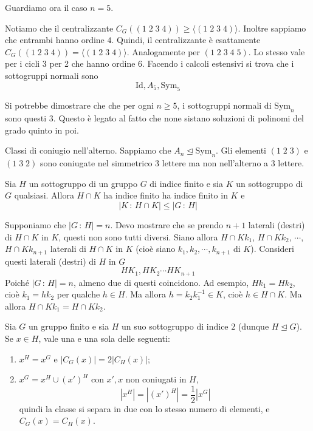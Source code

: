\documentclass[a4paper]{article}
\begin{document}
Guardiamo ora il caso \(n=5\).

Notiamo che il centralizzante \(C_G((1\;2\;3\;4)) \geq \langle(1\;2\;3\;4)\rangle\).
Inoltre sappiamo che entrambi hanno ordine \(4\). Quindi, il centralizzante
è esattamente \(C_G((1\;2\;3\;4)) = \langle(1\;2\;3\;4)\rangle\).
Analogamente per \((1\;2\;3\;4\;5)\). Lo stesso vale per i cicli 3 per 2 che hanno ordine 6.
Facendo i calcoli estensivi si trova che i sottogruppi normali sono
\[
    \text{Id}, A_5, \text{Sym}_5
\]

Si potrebbe dimostrare che che per ogni \(n \geq 5\), i sottogruppi normali di \(\text{Sym}_n\)
sono questi 3. Questo è legato al fatto che none sistano soluzioni di polinomi
del grado quinto in poi.

Classi di coniugio nell'alterno.
Sappiamo che \(A_n \unlhd \text{Sym}_n\).
Gli elementi \((1\;2\;3)\) e \((1\;3\;2)\) sono coniugate nel simmetrico
3 lettere ma non nell'alterno a 3 lettere.

\begin{snippetlemma}{}
    Sia \(H\) un sottogruppo di un gruppo \(G\)
    di indice finito e sia \(K\) un sottogruppo di
    \(G\) qualsiasi. Allora \(H \cap K\) ha indice finito
    ha indice finito in \(K\)
    e
    \[
        |K\,:\, H \cap K| \leq |G\,:\,H|
    \]
\end{snippetlemma}

\begin{snippetproof}{}
    Supponiamo che \(|G\,:\,H| = n\).
    Devo mostrare che se prendo \(n+1\) laterali (destri) di \(H \cap K\)
    in \(K\), questi non sono tutti diversi.
    Siano allora \(H \cap Kk_1\), \(H \cap Kk_2\), \(\cdots\), \(H \cap Kk_{n+1}\)
    laterali di \(H \cap K\) in \(K\) (cioè siano \(k_1, k_2, \cdots, k_{n+1}\) di \(K\)).
    Consideri questi laterali (destri) di \(H\) in \(G\)
    \[
        HK_1, HK_2 \cdots HK_{n+1}
    \]
    Poiché \(|G\,:\,H| = n\), almeno due di questi coincidono.
    Ad esempio, \(Hk_1 = Hk_2\), cioè \(k_1 = hk_2\)
    per qualche \(h\in H\).
    Ma allora \(h = k_2k_1^{-1} \in K\), cioè \(h \in H \cap K\).
    Ma allora \(H \cap Kk_1 = H\cap Kk_2\).
\end{snippetproof}

\begin{snippettheorem}{}
    Sia \(G\) un gruppo finito e sia \(H\)
    un suo sottogruppo di indice \(2\) (dunque \(H \unlhd G\)).
    Se \(x\in H\), vale una e una sola delle seguenti:
    \begin{enumerate}
        \item \(x^H = x^G\) e \(|C_G(x)| = 2 |C_H(x)|\);
        \item \(x^G = x^H \cup {(x')}^H\) con \(x', x\) non coniugati in \(H\),
            \[
                |x^H| = |{(x')}^H| = \frac{1}{2} |x^G|
            \]
            quindi la classe si separa in due con lo stesso numero di elementi,
            e \(C_G(x) = C_H(x)\).
    \end{enumerate}
\end{snippettheorem}
\end{document}
